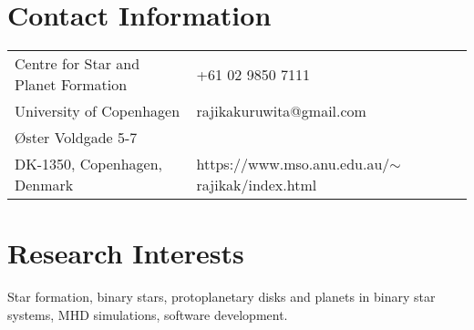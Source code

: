 \documentclass[margin,line]{res}
\begin{document}
	
	\begin{resume}
		\section{\sc Contact Information}
		\vspace{.05in}
		\begin{tabular}{@{}p{3in}p{4in}}
			Centre for Star and Planet Formation  & \hspace{-1cm}{\it Tel:}    +61 02 9850 7111 \\         
			University of Copenhagen & \hspace{-1cm}{\it E-mail:}  rajikakuruwita@gmail.com\\ 
			Øster Voldgade 5-7 &\hspace{-1cm}{\it Website:} \\   
			DK-1350, Copenhagen, Denmark  &  \hspace{-1cm}https://www.mso.anu.edu.au/$\sim$rajikak/index.html \\     
		\end{tabular}
		
		\section{\sc Research Interests}
		Star formation, binary stars, protoplanetary disks and planets in binary star systems, MHD simulations, software development.
		

\end{resume}
\end{document}
